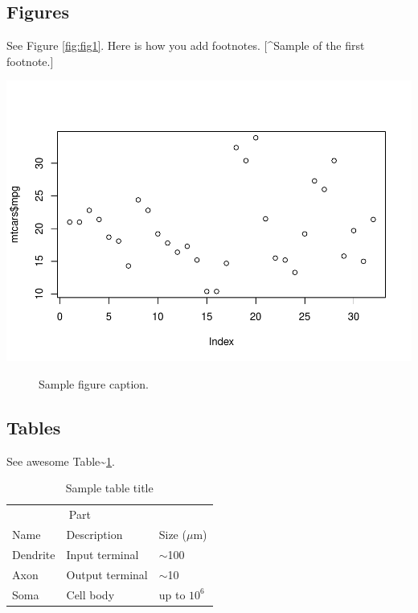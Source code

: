 \documentclass{article}
\newenvironment{Shaded}{\begin{snugshade}}{\end{snugshade}}
\newcommand{\FunctionTok}[1]{\textcolor[rgb]{0.00,0.00,0.00}{#1}}
\newcommand{\NormalTok}[1]{#1}
\newcommand{\SpecialCharTok}[1]{\textcolor[rgb]{0.00,0.00,0.00}{#1}}
\begin{document}
\hypertarget{figures}{%
\subsection{Figures}\label{figures}}

\lipsum[10] See Figure \ref{fig:fig1}. Here is how you add footnotes.
{[}\^{}Sample of the first footnote.{]}

\lipsum[11]

\begin{Shaded}
\end{Shaded}

\includegraphics{BLUP-manuscript_files/figure-latex/unnamed-chunk-1-1.pdf}

\begin{figure}
  \centering
  \fbox{\rule[-.5cm]{4cm}{4cm} \rule[-.5cm]{4cm}{0cm}}
  \caption{Sample figure caption.}
  \label{fig:fig2}
\end{figure}

\hypertarget{tables}{%
\subsection{Tables}\label{tables}}

\lipsum[12]

See awesome Table\textasciitilde{}\ref{tab:table}.

\begin{table}
 \caption{Sample table title}
  \centering
  \begin{tabular}{lll}
    \toprule
    \multicolumn{2}{c}{Part}                   \\
    \cmidrule(r){1-2}
    Name     & Description     & Size ($\mu$m) \\
    \midrule
    Dendrite & Input terminal  & $\sim$100     \\
    Axon     & Output terminal & $\sim$10      \\
    Soma     & Cell body       & up to $10^6$  \\
    \bottomrule
  \end{tabular}
  \label{tab:table}
\end{table}
\end{document}

